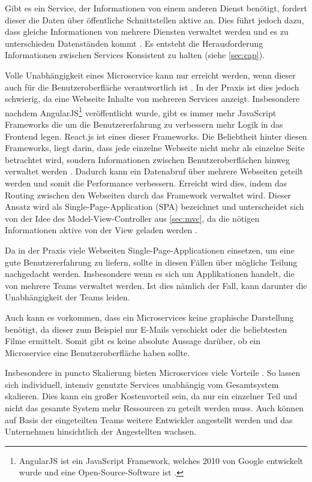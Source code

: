 Gibt es ein Service, der Informationen von einem anderen Dienst benötigt, fordert dieser die Daten über öffentliche Schnittstellen aktive an. Dies führt jedoch dazu, dass gleiche Informationen von mehrere Diensten verwaltet werden und es zu unterschieden Datenständen kommt \parencite[vgl.][Kap. 4.1]{wolff_microservices_2018}. Es entsteht die Herausforderung Informationen zwischen Services Konsistent zu halten (siehe \cref{sec:cap}).

Volle Unabhängigkeit eines Microservice kann nur erreicht werden, wenn dieser auch für die Benutzeroberfläche verantwortlich ist \parencite[vgl.][Kap. 4.4]{wolff_microservices_2018}. In der Praxis ist dies jedoch schwierig, da eine Webseite Inhalte von mehreren Services anzeigt. Insbesondere nachdem AngularJS\footnote{AngularJS ist ein JavaScript Framework, welches 2010 von Google entwickelt wurde und eine Open-Source-Software ist \parencite{angularjs}.} veröffentlicht wurde, gibt es immer mehr JavaScript Frameworks die um die Benutzererfahrung zu verbessern mehr Logik in das Frontend legen. React.js ist eines dieser Frameworks. Die Beliebtheit hinter diesen Frameworks, liegt darin, dass jede einzelne Webseite nicht mehr als einzelne Seite betrachtet wird, sondern Informationen zwischen Benutzeroberflächen hinweg verwaltet werden \parencite[vgl.][Kap. 9.1]{wolff_microservices_2018}. Dadurch kann ein Datenabruf über mehrere Webseiten geteilt werden und somit die Performance verbessern. Erreicht wird dies, indem das Routing zwischen den Webseiten durch das Framework verwaltet wird. Dieser Ansatz wird als Single-Page-Application (SPA) bezeichnet und unterscheidet sich von der Idee des Model-View-Controller aus \cref{sec:mvc}, da die nötigen Informationen aktive von der View geladen werden \parencite{single-page-webanwendung_2019}.

Da in der Praxis viele Webseiten Single-Page-Applicationen einsetzen, um eine gute Benutzererfahrung zu liefern, sollte in diesen Fällen über mögliche Teilung nachgedacht werden. Insbesondere wenn es sich um Applikationen handelt, die von mehrere Teams verwaltet werden. Ist dies nämlich der Fall, kann darunter die Unabhängigkeit der Teams leiden.

Auch kann es vorkommen, dass ein Microservices keine graphische Darstellung benötigt, da dieser zum Beispiel nur E-Mails verschickt oder die beliebtesten Filme ermittelt. Somit gibt es keine absolute Aussage darüber, ob ein Microservice eine Benutzeroberfläche haben sollte.

Insbesondere in puncto Skalierung bieten Microservices viele Vorteile \parencite[vgl.][Kap. 2.1.4]{newman_monolith_2019}. So lassen sich individuell, intensiv genutzte Services unabhängig vom Gesamtsystem skalieren. Dies kann ein großer Kostenvorteil sein, da nur ein einzelner Teil und nicht das gesamte System mehr Ressourcen zu geteilt werden muss. Auch können auf Basis der eingeteilten Teams weitere Entwickler angestellt werden und das Unternehmen hinsichtlich der Angestellten wachsen.

